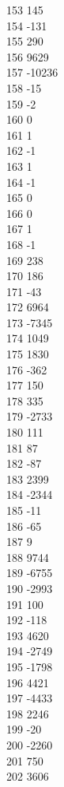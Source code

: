 { 153	145 \\
 154	-131 \\
 155	290 \\
 156	9629 \\
 157	-10236 \\
 158	-15 \\
 159	-2 \\
 160	0 \\
 161	1 \\
 162	-1 \\
 163	1 \\
 164	-1 \\
 165	0 \\
 166	0 \\
 167	1 \\
 168	-1 \\
 169	238 \\
 170	186 \\
 171	-43 \\
 172	6964 \\
 173	-7345 \\
 174	1049 \\
 175	1830 \\
 176	-362 \\
 177	150 \\
 178	335 \\
 179	-2733 \\
 180	111 \\
 181	87 \\
 182	-87 \\
 183	2399 \\
 184	-2344 \\
 185	-11 \\
 186	-65 \\
 187	9 \\
 188	9744 \\
 189	-6755 \\
 190	-2993 \\
 191	100 \\
 192	-118 \\
 193	4620 \\
 194	-2749 \\
 195	-1798 \\
 196	4421 \\
 197	-4433 \\
 198	2246 \\
 199	-20 \\
 200	-2260 \\
 201	750 \\
 202	3606 \\
}
